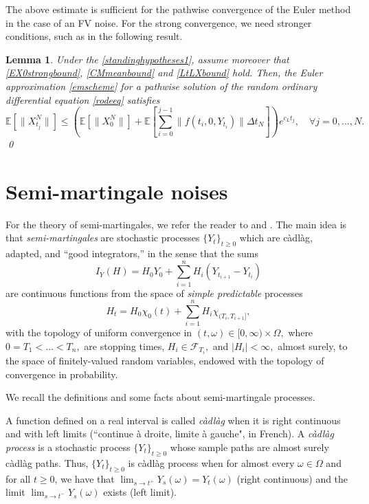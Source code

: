 \documentclass[reqno,12pt]{amsart}
\theoremstyle{plain} %
\newtheorem{lemma}{Lemma}[section]
\theoremstyle{definition} %
\begin{document}
The above estimate is sufficient for the pathwise convergence of the Euler method in the case of an FV noise. For the strong convergence, we need stronger conditions, such as in the following result.
\begin{lemma}
    \label{lemXNtmeanboundLXMt}
    Under the \cref{standinghypotheses1}, assume moreover that \eqref{EX0strongbound}, \eqref{CMmeanbound} and \eqref{LtLXbound} hold. Then, the Euler approximation \eqref{emscheme} for a pathwise solution of the random ordinary differential equation \eqref{rodeeq} satisfies
    \begin{equation}
        \label{XNtmeanboundLXMt}
        \mathbb{E}\left[\|X_{t_j}^N\|\right] \leq \left(\mathbb{E}\left[\|X_0^N\|\right] + \mathbb{E}\left[\sum_{i=0}^{j-1} \|f(t_i,0,Y_{t_i})\|\Delta t_N \right] \right)e^{c_L t_j}, \quad \forall j = 0, \ldots, N.
    \end{equation}
    \qed
\end{lemma}

\section{Semi-martingale noises}
\label{secsemimartingale}

For the theory of semi-martingales, we refer the reader to \cite{Protter2005} and \cite{Metivier1982}. The main idea is that \emph{semi-martingales} are stochastic processes $\{Y_t\}_{t\geq 0}$ which are c\`adl\`ag, adapted, and ``good integrators,'' in the sense that the sums
\[
    I_Y(H) = H_0 Y_0 + \sum_{i=1}^n H_i(Y_{t_{i+1}}-Y_{t_i})
\]
are continuous functions from the space of \emph{simple predictable} processes
\[
    H_t = H_0 \chi_{0}(t) + \sum_{i=1}^n H_i \chi_{(T_i, T_{i+1}]},
\]
with the topology of uniform convergence in $(t, \omega)\in [0,\infty)\times \Omega,$ where $0=T_1 < \ldots < T_n,$ are stopping times, $H_i \in \mathcal{F}_{T_i},$ and $|H_i| < \infty,$ almost surely, to the space of finitely-valued random variables, endowed with the topology of convergence in probability.

We recall the definitions and some facts about semi-martingale processes.

A function defined on a real interval is called \emph{c\`adl\`ag} when it is right continuous and with left limits (``continue \`a droite, limite \`a gauche", in French). A \emph{c\`adl\`ag process} is a stochastic process $\{Y_t\}_{t\geq 0}$ whose sample paths are almost surely c\`adl\`ag paths. Thus, $\{Y_t\}_{t\geq 0}$ is c\`adl\`ag process when for almost every $\omega\in \Omega$ and for all $t\geq 0$, we have that $\lim_{s\rightarrow t^+} Y_s(\omega) = Y_t(\omega)$ (right continuous) and the limit $\lim_{s \rightarrow t^-} Y_s(\omega)$ exists (left limit).
\end{document}
